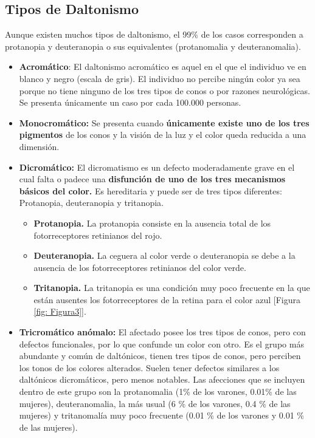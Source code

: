 \documentclass[10pt]{article}
\begin{document}
\subsection{Tipos de Daltonismo}

Aunque existen muchos tipos de daltonismo, el 99\% de los casos corresponden a protanopia y deuteranopia o sus equivalentes (protanomalia y deuteranomalia).

\begin{itemize}
    \item \textbf{Acromático}: El daltonismo acromático es aquel en el que el individuo ve en blanco y negro (escala de gris). El individuo no percibe ningún color ya sea porque no tiene ninguno de los tres tipos de conos o por razones neurológicas. Se presenta únicamente un caso por cada 100.000 personas\cite{IEEEreferencias:Ref31}.
    \item \textbf{Monocromático:} Se presenta cuando \textbf{únicamente existe uno de los tres pigmentos} de los conos y la visión de la luz y el color queda reducida a una dimensión\cite{IEEEreferencias:Ref31}.
    \item \textbf{Dicromático:} El dicromatismo es un defecto moderadamente grave en el cual falta o padece una \textbf{disfunción de uno de los tres mecanismos básicos del color.} Es hereditaria y puede ser de tres tipos diferentes: Protanopia, deuteranopia y tritanopia\cite{IEEEreferencias:Ref31}.

    \begin{itemize}
        \item \textbf{Protanopia.} La protanopia consiste en la ausencia total de los fotorreceptores retinianos del rojo.
        \item \textbf{Deuteranopia.} La ceguera al color verde o deuteranopia se debe a la ausencia de los fotorreceptores retinianos del color verde\cite{IEEEreferencias:Ref31}.
        \item \textbf{Tritanopia.} La tritanopia es una condición muy poco frecuente en la que están ausentes los fotorreceptores de la retina para el color azul \cite{IEEEreferencias:Ref31}[Figura \ref{fig: Figura3}].
    \end{itemize}
    \item \textbf{Tricromático anómalo: } El afectado posee los tres tipos de conos, pero con defectos funcionales, por lo que confunde un color con otro. Es el grupo más abundante y común de daltónicos, tienen tres tipos de conos, pero perciben los tonos de los colores alterados. Suelen tener defectos similares a los daltónicos dicromáticos, pero menos notables. Las afecciones que se incluyen dentro de este grupo son la protanomalia (1\% de los varones, 0.01\% de las mujeres), deuteranomalia, la más usual (6 \% de los varones, 0.4 \% de las mujeres) y tritanomalía muy poco frecuente (0.01 \% de los varones y 0.01 \% de las mujeres)\cite{IEEEreferencias:Ref31}.
\end{itemize}
\end{document}
